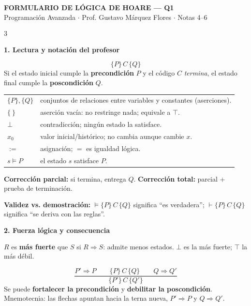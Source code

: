 \documentclass[10pt,letterpaper]{article}
\newcommand{\Htriple}[3]{\{#1\}\,#2\,\{#3\}}
\newcommand{\topic}[1]{%
  \vspace{1.0pt}\colorbox{azulclaro}{%
    \parbox{\dimexpr\linewidth-2\fboxsep\relax}{\color{azul}\bfseries #1}}\vspace{0.5pt}}
\begin{document}
\fontsize{6.85}{7.55}\selectfont

\begin{center}
  {\fontsize{13.2}{14}\selectfont\bfseries\color{azul} FORMULARIO DE LÓGICA DE HOARE --- Q1}\\[-1pt]
  {\small Programación Avanzada \(\cdot\) Prof. Gustavo Márquez Flores \(\cdot\) Notas 4--6}
\end{center}
\vspace{-5pt}

\begin{multicols*}{3}

\topic{1. Lectura y notación del profesor}

\[
\boxed{\Htriple{P}{C}{Q}}
\]
Si el estado inicial cumple la \textbf{precondición} $P$ y el código $C$
\emph{termina}, el estado final cumple la \textbf{poscondición} $Q$.

\begin{tabularx}{\linewidth}{@{}>{\bfseries}l X@{}}
$\{P\},\{Q\}$ & conjuntos de relaciones entre variables y constantes (aserciones).\\
$\{\ \}$ & aserción vacía: no restringe nada; equivale a $\top$.\\
$\bot$ & contradicción; ningún estado la satisface.\\
$x_0$ & valor inicial/histórico; no cambia aunque cambie $x$.\\
$:=$ & asignación; $=$ es igualdad lógica.\\
$s\models P$ & el estado $s$ satisface $P$.\\
\end{tabularx}

\textbf{Corrección parcial:} si termina, entrega $Q$.\quad
\textbf{Corrección total:} parcial $+$ prueba de terminación.

\textbf{Validez vs. demostración:}
$\models\Htriple{P}{C}{Q}$ significa ``es verdadera''; 
$\vdash\Htriple{P}{C}{Q}$ significa ``se deriva con las reglas''.

\topic{2. Fuerza lógica y consecuencia}

$R$ es \textbf{más fuerte} que $S$ si $R\Rightarrow S$: admite menos estados.
$\bot$ es la más fuerte; $\top$ la más débil.

\[
\boxed{
\frac{P'\Rightarrow P\qquad \Htriple{P}{C}{Q}\qquad Q\Rightarrow Q'}
     {\Htriple{P'}{C}{Q'}}}
\]
Se puede \textbf{fortalecer la precondición} y \textbf{debilitar la
poscondición}. Mnemotecnia: las flechas apuntan hacia la terna nueva,
$P'\Rightarrow P$ y $Q\Rightarrow Q'$.


\end{multicols*}
\end{document}
